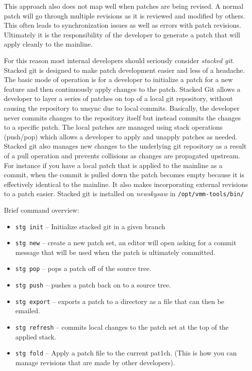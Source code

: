 \documentclass[11pt]{article}
\begin{document}
This approach also does not map well when patches are being revised. A
normal patch will go through multiple revisions as it is reviewed and
modified by others. This often leads to synchronization issues as well
as errors with patch revisions. Ultimately it is the responsibility of
the developer to generate a patch that will apply cleanly to the
mainline.

For this reason most internal developers should seriously consider
{\em stacked git}. Stacked git is designed to make patch development
easier and less of a headache. The basic mode of operation is for a
developer to initialize a patch for a new feature and then continuously
apply changes to the patch. Stacked Git allows a developer to layer a
series of patches on top of a local git repository, without causing
the repository to unsync due to local commits. Basically, the
developer never commits changes to the repository itself but instead
commits the changes to a specific patch. The local patches are managed
using stack operations (push/pop) which allows a developer to apply
and unapply patches as needed. Stacked git also manages new changes to
the underlying git repository as a result of a pull operation and
prevents collisions as changes are propagated upstream. For instance
if you have a local patch that is applied to the mainline as a commit,
when the commit is pulled down the patch becomes empty because it is
effectively identical to the mainline. It also makes incorporating
external revisions to a patch easier. Stacked git is installed on {\em
newskysaw} in \verb./opt/vmm-tools/bin/. 

Brief command overview:
\begin{itemize}
\item \verb.stg init. -- Initialize stacked git in a given branch
\item \verb.stg new. -- create a new patch set, an editor will open
asking for a commit message that will be used when the patch is
ultimately committed.
\item \verb.stg pop. -- pops a patch off of the source tree.
\item \verb.stg push. -- pushes a patch back on to a source tree.
\item \verb.stg export. -- exports a patch to a directory as a file
that can then be emailed.
\item \verb.stg refresh. -- commits local changes to the patch set at
the top of the applied stack.
\item \verb.stg fold. -- Apply a patch file to the current
pat1ch. (This is how you can manage revisions that are made by other developers).
\end{itemize}
\end{document}
